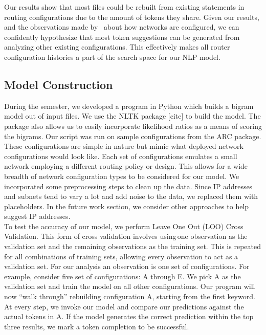 Our results show that most files could be rebuilt from existing statements in routing configurations due to the amount of tokens they share. Given our results, and the observations made by~\cite{complexity} about how networks are configured, we can confidently hypothesize that most token suggestions can be generated from analyzing other existing configurations. This effectively makes all router configuration histories a part of the search space for our NLP model. 

\subsection{Model Construction}
During the semester, we developed a program in Python which builds a bigram model out of input files. We use the NLTK package [cite] to build the model. The package also allows us to easily incorporate likelihood ratios as a means of scoring the bigrams. Our script was run on sample configurations from the ARC package. These configurations are simple in nature but mimic what deployed network configurations would look like. Each set of configurations emulates a small network employing a different routing policy or design. This allows for a wide breadth of network configuration types to be considered for our model. We incorporated some preprocessing steps to clean up the data. Since IP addresses and subnets tend to vary a lot and add noise to the data, we replaced them with placeholders. In the future work section, we consider other approaches to help suggest IP addresses.\\

To test the accuracy of our model, we perform Leave One Out (LOO) Cross Validation. This form of cross validation involves using one observation as the validation set and the remaining observations as the training set. This is repeated for all combinations of training sets, allowing every observation to act as a validation set. For our analysis an observation is one set of configurations. For example, consider five set of configurations: A through E. We pick A as the validation set and train the model on all other configurations. Our program will now “walk through” rebuilding configuration A, starting from the first keyword. At every step, we invoke our model and compare our predictions against the actual tokens in A. If the model generates the correct prediction within the top three results, we mark a token completion to be successful.\\
 

